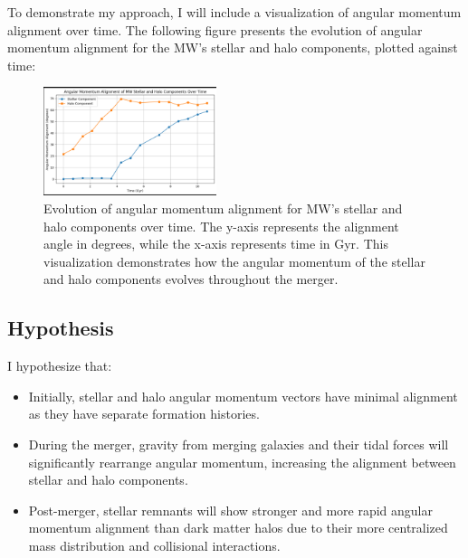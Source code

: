 \documentclass[twocolumn]{aastex631}
\begin{document}
To demonstrate my approach, I will include a visualization of angular momentum alignment over time. The following figure presents the evolution of angular momentum alignment for the MW's stellar and halo components, plotted against  time:

\begin{figure}[ht!]
    \centering
    \includegraphics[width=0.45\textwidth]{MW_Angular_Momentum_Alignment_Time.png}
    \caption{Evolution of angular momentum alignment for MW's stellar and halo components over time. The y-axis represents the alignment angle in degrees, while the x-axis represents time in Gyr. This visualization demonstrates how the angular momentum of the stellar and halo components evolves throughout the merger.}
    \label{fig:angular_momentum_alignment}
\end{figure}


\subsection{Hypothesis}
I hypothesize that:
\begin{itemize}
    \item Initially, stellar and halo angular momentum vectors have minimal alignment as they have separate formation histories.
    \item During the merger, gravity from merging galaxies and their tidal forces will significantly rearrange angular momentum, increasing the alignment between stellar and halo components.
    \item Post-merger, stellar remnants will show stronger and more rapid angular momentum alignment than dark matter halos due to their more centralized mass distribution and collisional interactions.
\end{itemize}




\end{document}
